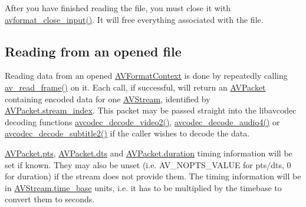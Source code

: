 After you have finished reading the file, you must close it with \hyperlink{group__lavf__decoding_gae804b99aec044690162b8b9b110236a4}{avformat\+\_\+close\+\_\+input()}. It will free everything associated with the file.\hypertarget{group__lavf__decoding_lavf_decoding_read}{}\subsection{Reading from an opened file}\label{group__lavf__decoding_lavf_decoding_read}
Reading data from an opened \hyperlink{struct_a_v_format_context}{A\+V\+Format\+Context} is done by repeatedly calling \hyperlink{group__lavf__decoding_ga4fdb3084415a82e3810de6ee60e46a61}{av\+\_\+read\+\_\+frame()} on it. Each call, if successful, will return an \hyperlink{struct_a_v_packet}{A\+V\+Packet} containing encoded data for one \hyperlink{struct_a_v_stream}{A\+V\+Stream}, identified by \hyperlink{struct_a_v_packet_a0d1cb9b5a32b00fb6edc81ea3aae2a49}{A\+V\+Packet.\+stream\+\_\+index}. This packet may be passed straight into the libavcodec decoding functions \hyperlink{group__lavc__decoding_ga99ee61b6dcffb7817a275d39da58cc74}{avcodec\+\_\+decode\+\_\+video2()}, \hyperlink{group__lavc__decoding_ga834bb1b062fbcc2de4cf7fb93f154a3e}{avcodec\+\_\+decode\+\_\+audio4()} or \hyperlink{group__lavc__decoding_ga47db1b7f294b9f92684401b9c66a7c4b}{avcodec\+\_\+decode\+\_\+subtitle2()} if the caller wishes to decode the data.

\hyperlink{struct_a_v_packet_a73bde0a37f3b1efc839f11295bfbf42a}{A\+V\+Packet.\+pts}, \hyperlink{struct_a_v_packet_a85dbbd306b44b02390cd91c45e6a0f76}{A\+V\+Packet.\+dts} and \hyperlink{struct_a_v_packet_af151ba1967c37038088883cd544eeacd}{A\+V\+Packet.\+duration} timing information will be set if known. They may also be unset (i.\+e. A\+V\+\_\+\+N\+O\+P\+T\+S\+\_\+\+V\+A\+L\+UE for pts/dts, 0 for duration) if the stream does not provide them. The timing information will be in \hyperlink{struct_a_v_stream_a9db755451f14e2bf590d4b85d82b32e6}{A\+V\+Stream.\+time\+\_\+base} units, i.\+e. it has to be multiplied by the timebase to convert them to seconds.

